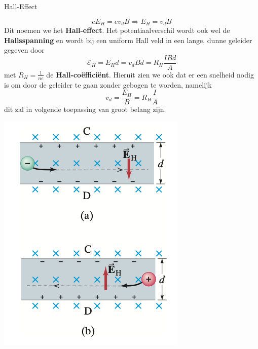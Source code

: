 \begin{theo}{Hall-Effect}
\begin{minipage}{0.76\textwidth}
        \begin{equation*}
            eE_H = ev_{d}B \Rightarrow E_H = v_{d}B
        \end{equation*}
        Dit noemen we het \textbf{Hall-effect}. Het potentiaalverschil wordt ook wel de \textbf{Hallsspanning}
        en wordt bij een uniform Hall veld in een lange, dunne geleider gegeven door
        \begin{equation*}
            \mathcal{E}_H = E_{H}d = v_{d}Bd = R_H\dfrac{IBd}{A}
        \end{equation*}
        met $R_H = \tfrac{1}{ne}$ de \textbf{Hall-coëfficiënt}. Hieruit zien we ook dat er een snelheid
        nodig is om door de geleider te gaan zonder gebogen te worden, namelijk
        \begin{equation*}
            v_{d} = \dfrac{E_H}{B} = R_H\dfrac{I}{A}
        \end{equation*}
        dit zal in volgende toepassing van groot belang zijn.    
    \end{minipage}
    \begin{minipage}{.20\textwidth}
        \includegraphics[scale = 0.3]{Images/Magnetisme/HallEffect}
    \end{minipage} 
\end{theo}


